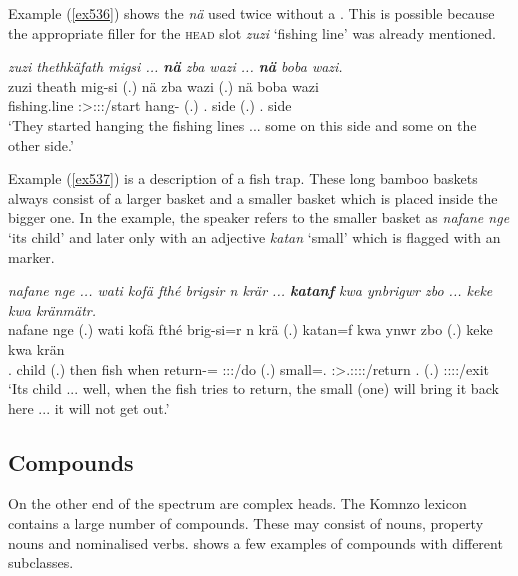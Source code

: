 Example (\ref{ex536}) shows the   \emph{nä} used twice without a . This is possible because the appropriate filler for the \textsc{head} slot \emph{zuzi} `fishing line' was already mentioned.

\begin{exe}
 	\ex \emph{zuzi thethkäfath migsi ... \textbf{nä} zba wazi ... \textbf{nä} boba wazi.}\\
 	\gll zuzi theath mig-si (.) nä zba wazi (.) nä boba wazi\\
	{fishing.line} \Stpl:\Sbj>\Stpl:\Obj:\Pst:\Pfv/start hang-\Nmlz{} (.) \Indf{} \Prox.\Abl{} side (.) \Indf{} \Med.\Abl{} side\\
 	\trans `They started hanging the fishing lines ... some on this side and some on the other side.'
 	\label{ex536}
\end{exe}

Example (\ref{ex537}) is a description of a fish trap. These long bamboo baskets always consist of a larger basket and a smaller basket which is placed inside the bigger one. In the example, the speaker refers to the smaller basket as \emph{nafane nge} `its child' and later only with an adjective \emph{katan} `small' which is flagged with an   marker.

\begin{exe}
 	\ex \emph{nafane nge ... wati kofä fthé brigsir n krär ... \textbf{katanf} kwa ynbrigwr zbo ... keke kwa kränmätr.}\\
 	\gll nafane nge (.) wati kofä fthé brig-si=r n krä (.) katan=f kwa ynwr zbo (.) keke kwa krän\\
 	\Tsg.\Poss{} child (.) then fish when return-\Nmlz=\Purp{} \Imn{} \Stsg:\Sbj:\Irr:\Pfv/do (.) small=\Erg.\Sg{} \Fut{} \Stsg:\Sbj>\Tsg.\Masc:\Obj:\Nonpast:\Ipfv:\Venit/return \Prox.\All{} (.) \Neg{} \Fut{} \Stsg:\Sbj:\Irr:\Pfv:\Venit/exit\\
 	\trans `Its child ... well, when the fish tries to return, the small (one) will bring it back here ... it will not get out.'
 	\label{ex537}
\end{exe}

\subsection{Compounds}\label{headcompounds}

On the other end of the spectrum are complex heads. The Komnzo lexicon contains a large number of  compounds. These may consist of nouns, property nouns and nominalised verbs.  shows a few examples of compounds with different  subclasses.

